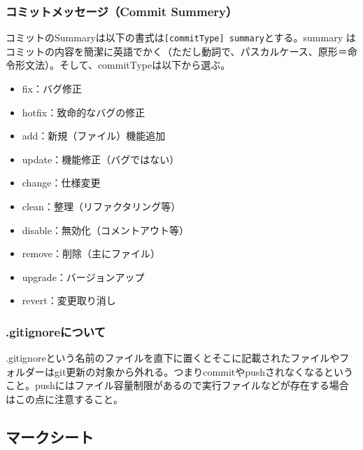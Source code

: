 \documentclass[dvipdfmx,jb5]{jarticle}
\begin{document}
 \subsubsection{コミットメッセージ（Commit Summery）}
 コミットのSummaryは以下の書式は\verb|[commitType] summary|とする。summary はコミットの内容を簡潔に英語でかく（ただし動詞で、パスカルケース、原形＝命令形文法）。そして、commitTypeは以下から選ぶ。

\begin{itemize}
\item fix：バグ修正　
\item hotfix：致命的なバグの修正
\item add：新規（ファイル）機能追加
\item update：機能修正（バグではない）
\item change：仕様変更
\item clean：整理（リファクタリング等）
\item disable：無効化（コメントアウト等）
\item remove：削除（主にファイル）
\item upgrade：バージョンアップ
\item revert：変更取り消し
\end{itemize}
\subsubsection{.gitignoreについて}\label{sec:gitignore}
.gitignoreという名前のファイルを直下に置くとそこに記載されたファイルやフォルダーはgit更新の対象から外れる。つまりcommitやpushされなくなるということ。pushにはファイル容量制限があるので実行ファイルなどが存在する場合はこの点に注意すること。
\subsection{マークシート}
\end{document}
